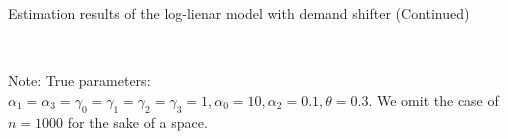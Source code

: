 \documentclass[11pt, a4paper]{article}
\begin{document}
\begin{adjustbox}{angle=90}
    \begin{table}[!htbp]
       \ContinuedFloat  %
       \begin{center}
           \caption{Estimation results of the log-lienar model with demand shifter (Continued)}
           \label{tb:loglinear_loglinear_sigma_0.001_separate_non_constraint_non_constraint} 
           \subfloat[$\sigma=1.0$]{}\\
         \subfloat[$\sigma=2.0$]{}
       \end{center}\footnotesize
       Note: True parameters: $\alpha_1 = \alpha_3 = \gamma_0 = \gamma_1 = \gamma_2  = \gamma_3 = 1, \alpha_0 = 10, \alpha_2 = 0.1,  \theta = 0.3.$ We omit the case of $n=1000$ for the sake of a space.
     \end{table} 
\end{adjustbox}



\end{document}

